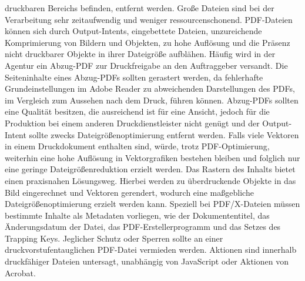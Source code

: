 druckbaren Bereichs befinden, entfernt werden. Große Dateien sind bei der Verarbeitung sehr zeitaufwendig und weniger ressourcenschonend. PDF-Dateien können sich durch Output-Intents, eingebettete Dateien, unzureichende Komprimierung von Bildern und Objekten, zu hohe Auflösung und die Präsenz nicht druckbarer Objekte in ihrer Dateigröße aufblähen. Häufig wird in der Agentur ein Abzug-PDF zur Druckfreigabe an den Auftraggeber versandt. Die Seiteninhalte eines Abzug-PDFs sollten gerastert werden, da fehlerhafte Grundeinstellungen im Adobe Reader zu abweichenden Darstellungen des PDFs, im Vergleich zum Aussehen nach dem Druck, führen können. Abzug-PDFs sollten eine Qualität besitzen, die ausreichend ist für eine Ansicht, jedoch für die Produktion bei einem anderen Druckdienstleister nicht genügt und der Output-Intent sollte zwecks Dateigrößenoptimierung entfernt werden. Falls viele Vektoren in einem Druckdokument enthalten sind, würde, trotz PDF-Optimierung, weiterhin eine hohe Auflösung in Vektorgrafiken bestehen bleiben und folglich nur eine geringe Dateigrößenreduktion erzielt werden. Das Rastern des Inhalts bietet einen praxisnahen Lösungsweg. Hierbei werden zu überdruckende Objekte in das Bild eingerechnet und Vektoren gerendert, wodurch eine maßgebliche Dateigrößenoptimierung erzielt werden kann. Speziell bei PDF/X-Dateien müssen bestimmte Inhalte als Metadaten vorliegen, wie der Dokumententitel, das Änderungsdatum der Datei, das PDF-Erstellerprogramm und das Setzes des Trapping Keys. Jeglicher Schutz oder Sperren sollte an einer druckvorstufentauglichen PDF-Datei vermieden werden. Aktionen sind innerhalb druckfähiger Dateien untersagt, unabhängig von JavaScript oder Aktionen von Acrobat. \\
